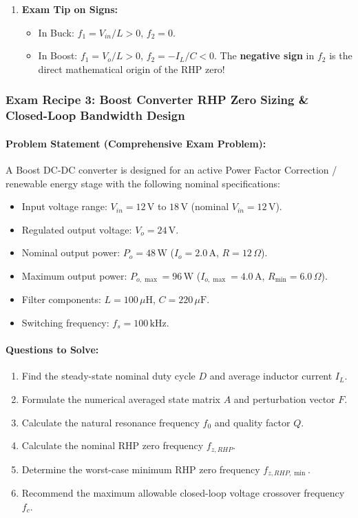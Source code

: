 \begin{enumerate}
\[  \]
  \item \textbf{Exam Tip on Signs:}
  \begin{itemize}
    \item In Buck: $f_1 = V_{in}/L > 0$, $f_2 = 0$.
    \item In Boost: $f_1 = V_o/L > 0$, $f_2 = -I_L/C < 0$. The \textbf{negative sign} in $f_2$ is the direct mathematical origin of the RHP zero!
  \end{itemize}
\end{enumerate}

\subsubsection{Exam Recipe 3: Boost Converter RHP Zero Sizing \& Closed-Loop Bandwidth Design}
\paragraph{Problem Statement (Comprehensive Exam Problem):}
A Boost DC-DC converter is designed for an active Power Factor Correction / renewable energy stage with the following nominal specifications:
\begin{itemize}
  \item Input voltage range: $V_{in} = 12\,\si{\volt}$ to $18\,\si{\volt}$ (nominal $V_{in} = 12\,\si{\volt}$).
  \item Regulated output voltage: $V_o = 24\,\si{\volt}$.
  \item Nominal output power: $P_o = 48\,\si{\watt}$ ($I_o = 2.0\,\si{\ampere}$, $R = 12\,\Omega$).
  \item Maximum output power: $P_{o,\max} = 96\,\si{\watt}$ ($I_{o,\max} = 4.0\,\si{\ampere}$, $R_{\min} = 6.0\,\Omega$).
  \item Filter components: $L = 100\,\mu\si{\henry}$, $C = 220\,\mu\si{\farad}$.
  \item Switching frequency: $f_s = 100\,\si{\kilo\hertz}$.
\end{itemize}

\paragraph{Questions to Solve:}
\begin{enumerate}
  \item Find the steady-state nominal duty cycle $D$ and average inductor current $I_L$.
  \item Formulate the numerical averaged state matrix $A$ and perturbation vector $F$.
  \item Calculate the natural resonance frequency $f_0$ and quality factor $Q$.
  \item Calculate the nominal RHP zero frequency $f_{z,RHP}$.
  \item Determine the worst-case minimum RHP zero frequency $f_{z,RHP,\min}$.
  \item Recommend the maximum allowable closed-loop voltage crossover frequency $f_c$.
\end{enumerate}

